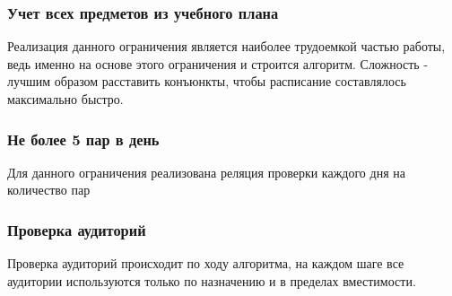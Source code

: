 \subsubsection{Учет всех предметов из учебного плана}
Реализация данного ограничения является наиболее трудоемкой частью работы, ведь именно на основе этого ограничения и строится алгоритм. Сложность - лучшим образом расставить конъюнкты, чтобы расписание составлялось максимально быстро.

\subsubsection{Не более 5 пар в день}
Для данного ограничения реализована реляция проверки каждого дня на количество пар

\subsubsection{Проверка аудиторий}
Проверка аудиторий происходит по ходу алгоритма, на каждом шаге все аудитории используются только по назначению и в пределах вместимости.





